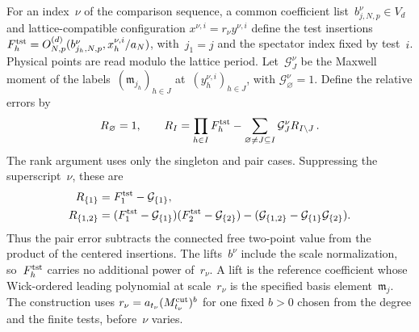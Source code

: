 For an index~$\nu$ of the comparison sequence, a common coefficient list~$b^\nu_{j,N,p}\in V_d$ and lattice-compatible configuration $x^{\nu,i}=r_\nu y^{\nu,i}$ define the test insertions $F_h^{\rm tst}=O^{(d)}_{N,p}(b^\nu_{j_h,N,p},x_h^{\nu,i}/a_N)$, with~$j_1=j$ and the spectator index fixed by test~$i$. Physical points are read modulo the lattice period. Let~$\mathcal G_J^\nu$ be the Maxwell moment of the labels~$(\mathfrak m_{j_h})_{h\in J}$ at~$(y_h^{\nu,i})_{h\in J}$, with $\mathcal G_\varnothing^\nu=1$. Define the relative errors by
\begin{equation}\label{eq:F-relative}
R_\varnothing=1,\qquad
R_I=\prod_{h\in I}F_h^{\rm tst}-
\sum_{\varnothing\ne J\subseteq I}\mathcal G_J^\nu R_{I\setminus J}\,.
\end{equation}
The rank argument uses only the singleton and pair cases. Suppressing the superscript~$\nu$, these are
\begin{equation*}
\begin{aligned}
R_{\{1\}}&=F_1^{\rm tst}-\mathcal G_{\{1\}},\\
R_{\{1,2\}}&=(F_1^{\rm tst}-\mathcal G_{\{1\}})(F_2^{\rm tst}-\mathcal G_{\{2\}})
-(\mathcal G_{\{1,2\}}-\mathcal G_{\{1\}}\mathcal G_{\{2\}}).
\end{aligned}
\end{equation*}
Thus the pair error subtracts the connected free two-point value from the product of the centered insertions. The lifts~$b^\nu$ include the scale normalization, so~$F_h^{\rm tst}$ carries no additional power of~$r_\nu$. A lift is the reference coefficient whose Wick-ordered leading polynomial at scale~$r_\nu$ is the specified basis element~$\mathfrak m_j$. The construction uses $r_\nu=a_{t_\nu}(M^{\mathrm{cut}}_{t_\nu})^b$ for one fixed $b>0$ chosen from the degree and the finite tests, before~$\nu$ varies.

